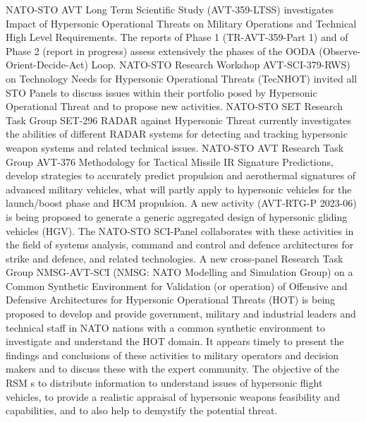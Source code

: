 NATO-STO AVT Long Term Scientific Study (AVT-359-LTSS) investigates Impact of Hypersonic Operational Threats on Military Operations and Technical High Level Requirements. The reports of Phase 1 (TR-AVT-359-Part 1) and of Phase 2 (report in progress) assess extensively the phases of the OODA (Observe-Orient-Decide-Act) Loop.
NATO-STO Research Workshop AVT-SCI-379-RWS) on Technology Needs for Hypersonic Operational Threats (TecNHOT) invited all STO Panels to discuss issues within their portfolio posed by Hypersonic Operational Threat and to propose new activities.
NATO-STO SET Research Task Group SET-296 RADAR against Hypersonic Threat currently investigates the abilities of different RADAR systems for detecting and tracking hypersonic weapon systems and related technical issues.
NATO-STO AVT Research Task Group AVT-376 Methodology for Tactical Missile IR Signature Predictions, develop strategies to accurately predict propulsion and aerothermal signatures of advanced military vehicles, what will partly apply to hypersonic vehicles for the launch/boost phase and HCM propulsion.
A new activity (AVT-RTG-P 2023-06) is being proposed to generate a generic aggregated design of hypersonic gliding vehicles (HGV).
The NATO-STO SCI-Panel collaborates with these activities in the field of systems analysis, command and control and defence architectures for strike and defence, and related technologies.
A new cross-panel Research Task Group NMSG-AVT-SCI (NMSG: NATO Modelling and Simulation Group) on a Common Synthetic Environment for Validation (or operation) of Offensive and Defensive Architectures for Hypersonic Operational Threats (HOT) is being proposed to develop and provide government, military and industrial leaders and technical staff in NATO nations with a common synthetic environment to investigate and understand the HOT domain. 
It appears timely to present the findings and conclusions of these activities to military operators and decision makers and to discuss these with the expert community. The objective of the RSM s to distribute information to understand issues of hypersonic flight vehicles, to provide a realistic appraisal of hypersonic weapons feasibility and capabilities, and to also help to demystify the potential threat.

